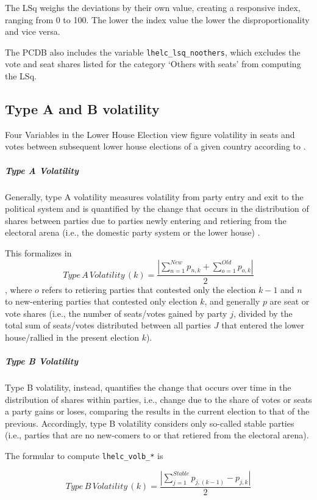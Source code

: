 The LSq weighs the deviations by their own value, creating a responsive index, ranging from 0 to 100. The lower the index value the lower the disproportionality and vice versa. 

The PCDB also includes the variable \texttt{\footnotesize lhelc\_lsq\_noothers}, which excludes the vote and seat shares listed for the category `Others with seats' from computing the LSq.

\subsection{Type A and B volatility}
Four Variables in the Lower House Election view figure volatility in seats and votes between subsequent lower house elections of a given country according to \citet*{Powell&Tucker2013}. 

\subparagraph{Type A Volatility}
Generally, type A volatility measures volatility from party entry and exit to the political system and is quantified by the change that occurs in the distribution of shares between parties due to parties newly entering and retiering from the electoral arena (i.e., the domestic party system or the lower house) \citep{Powell&Tucker2013}. 

This formalizes in
\begin{equation}
Type\,A\,Volatility\,(k) = \frac{ | \sum\limits_{n=1}^{New} p_{n,k} + \sum\limits_{o=1}^{Old} p_{o,k} | }{2}
\end{equation}
, where $o$ refers to retiering parties that contested only the election $k-1$ and $n$ to new-entering
parties that contested only election $k$, and generally $p$ are seat or vote shares (i.e., the number of seats/votes gained by party $j$, divided by the total sum of seats/votes distributed between all parties $J$ that entered the lower house/rallied in the present election $k$).

\subparagraph{Type B Volatility}
Type B volatility, instead, quantifies the change that occurs over time in the distribution of shares within parties, i.e., change due to the share of votes or seats a party gains or loses, comparing the results in the current election to that of the previous. Accordingly, type B volatility considers only so-called stable parties (i.e., parties that are no new-comers to or that retiered from the electoral arena).

The formular to compute  \texttt{\footnotesize lhelc\_volb\_*} is

\begin{equation}
Type\,B\,Volatility\,(k) = \frac{ | \sum\limits_{j=1}^{Stable} p_{j,(k-1)} - p_{j,k}| }{2}
\end{equation}

